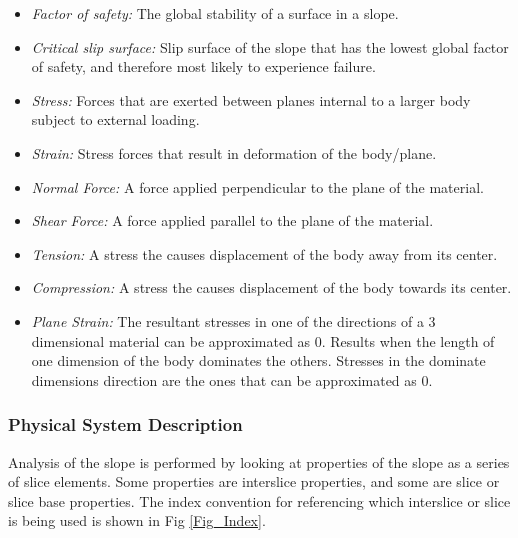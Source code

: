 \documentclass[12pt]{article}
\newcommand{\fref}[1]{Fig \ref{#1}}
\begin{document}
\begin{itemize}
\item {\textit{Factor of safety:} The global stability of a surface in a slope.}
  
\item {\textit{Critical slip surface:} Slip surface of the slope that
  has the lowest global factor of safety, and therefore most likely to
  experience failure.}

\item {\textit{Stress:} Forces that are exerted between planes
  internal to a larger body subject to external loading.}
  
\item {\textit{Strain:} Stress forces that result in deformation of
  the body/plane.}
  
\item {\textit{Normal Force:} A force applied perpendicular to the
  plane of the material.}
  
\item {\textit{Shear Force:} A force applied parallel to the plane of
  the material.}
  
\item {\textit{Tension:} A stress the causes displacement of the body
  away from its center.}
  
\item {\textit{Compression:} A stress the causes displacement of the
  body towards its center.}
  
\item {\textit{Plane Strain:} The resultant stresses in one of the
  directions of a 3 dimensional material can be approximated as
  0. Results when the length of one dimension of the body dominates
  the others. Stresses in the dominate dimensions direction are the
  ones that can be approximated as 0.}
  
\end{itemize}

\subsubsection{Physical System Description} \label{sec_system}

Analysis of the slope is performed by looking at properties of the
slope as a series of slice elements. Some properties are interslice
properties, and some are slice or slice base properties.  The index
convention for referencing which interslice or slice is being used is
shown in \fref{Fig_Index}.
\end{document}
